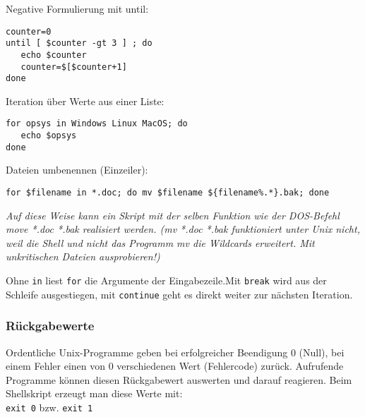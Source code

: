 \documentclass[11pt]{article}
\begin{document}
Negative Formulierung mit until:
\begin{verbatim}
counter=0
until [ $counter -gt 3 ] ; do
   echo $counter
   counter=$[$counter+1]
done
\end{verbatim}


Iteration über Werte aus einer Liste:
\begin{verbatim}
for opsys in Windows Linux MacOS; do
   echo $opsys 
done
\end{verbatim}

Dateien umbenennen (Einzeiler): 
\begin{verbatim}
for $filename in *.doc; do mv $filename ${filename%.*}.bak; done
\end{verbatim}
\textit{Auf diese Weise kann ein Skript mit der selben Funktion wie
  der DOS-Befehl move *.doc *.bak realisiert werden. (mv *.doc *.bak
  funktioniert unter Unix nicht, weil die Shell und nicht das Programm
  mv die Wildcards erweitert. Mit unkritischen Dateien ausprobieren!)}

Ohne \texttt{in} liest \texttt{for} die Argumente der Eingabezeile.Mit
\texttt{break} wird aus der Schleife ausgestiegen, mit
\texttt{continue} geht es direkt weiter zur nächsten Iteration.

\subsubsection{Rückgabewerte} 
Ordentliche Unix-Programme geben bei erfolgreicher Beendigung 0
(Null), bei einem Fehler einen von 0 verschiedenen Wert (Fehlercode)
zurück. Aufrufende Programme können diesen Rückgabewert auswerten und
darauf reagieren. Beim Shellskript erzeugt man diese Werte mit:\\
\texttt{exit 0} bzw. \texttt{exit 1}
\end{document}
